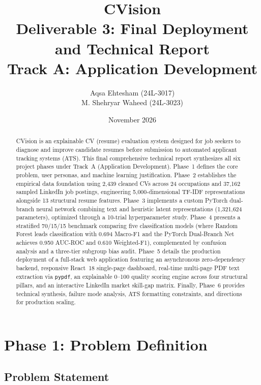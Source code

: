 \documentclass[11pt,a4paper]{article}
\title{\textbf{CVision}\\[2pt]
  \large Deliverable 3: Final Deployment and Technical Report\\[2pt]
  \normalsize Track A: Application Development}
\author{Aqsa Ehtesham (24L-3017)\\ M. Shehryar Waheed (24L-3023)}
\date{November 2026}
\begin{document}
\maketitle

\begin{abstract}
\noindent CVision is an explainable CV (resume) evaluation system designed for
job seekers to diagnose and improve candidate resumes before submission to
automated applicant tracking systems (ATS). This final comprehensive technical
report synthesizes all six project phases under Track~A (Application Development).
Phase~1 defines the core problem, user personas, and machine learning justification.
Phase~2 establishes the empirical data foundation using 2{,}439 cleaned CVs
across 24 occupations and 37{,}162 sampled LinkedIn job postings, engineering
5{,}000-dimensional TF-IDF representations alongside 13 structural resume features.
Phase~3 implements a custom PyTorch dual-branch neural network combining text
and heuristic latent representations (1{,}321{,}624 parameters), optimized
through a 10-trial hyperparameter study. Phase~4 presents a stratified
70/15/15 benchmark comparing five classification models (where Random Forest
leads classification with 0.694 Macro-F1 and the PyTorch Dual-Branch Net achieves
0.950 AUC-ROC and 0.610 Weighted-F1), complemented by confusion analysis and a
three-tier subgroup bias audit. Phase~5 details the production deployment of a full-stack web
application featuring an asynchronous zero-dependency backend, responsive
React~18 single-page dashboard, real-time multi-page PDF text extraction via
\texttt{pypdf}, an explainable 0--100 quality scoring engine across four
structural pillars, and an interactive LinkedIn market skill-gap matrix.
Finally, Phase~6 provides technical synthesis, failure mode analysis, ATS
formatting constraints, and directions for production scaling.
\end{abstract}


\tableofcontents
\newpage


\section{Phase 1: Problem Definition}

\subsection{Problem Statement}
\end{document}

